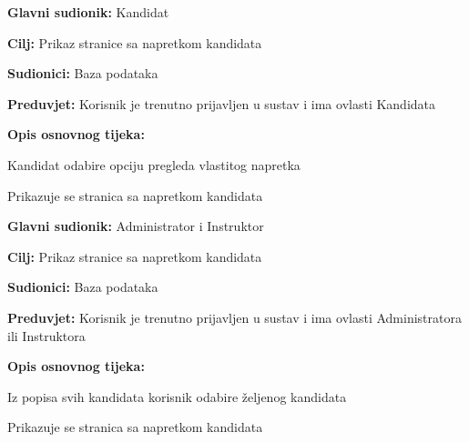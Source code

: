 \noindent {}
	\begin{packed_item}
		
		\item \textbf{Glavni sudionik:}  Kandidat
		\item  \textbf{Cilj:} Prikaz stranice sa napretkom kandidata 
		\item  \textbf{Sudionici:} Baza podataka
		\item  \textbf{Preduvjet:} Korisnik je trenutno prijavljen u sustav i ima ovlasti Kandidata
		\item  \textbf{Opis osnovnog tijeka:}
		
		\item[] \begin{packed_enum}
			
			\item Kandidat odabire opciju pregleda vlastitog napretka
		
                \item Prikazuje se stranica sa napretkom kandidata
			
		\end{packed_enum}
		
	\end{packed_item}

 \noindent {}
	\begin{packed_item}
		
		\item \textbf{Glavni sudionik:} Administrator i Instruktor
		\item  \textbf{Cilj:} Prikaz stranice sa napretkom kandidata 
		\item  \textbf{Sudionici:} Baza podataka
		\item  \textbf{Preduvjet:} Korisnik je trenutno prijavljen u sustav i ima ovlasti Administratora ili Instruktora
		\item  \textbf{Opis osnovnog tijeka:}
		
		\item[] \begin{packed_enum}
			
			\item Iz popisa svih kandidata korisnik odabire željenog kandidata
                \item Prikazuje se stranica sa napretkom kandidata
			
		\end{packed_enum}
		
	\end{packed_item}

